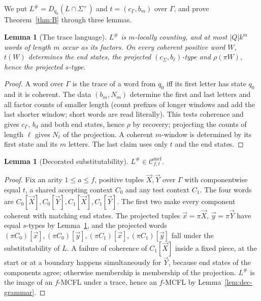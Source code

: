 \documentclass[11pt]{article}
\numberwithin{equation}{section}
\theoremstyle{plain}
\newtheorem{lemma}[theorem]{Lemma}
\theoremstyle{definition}
\theoremstyle{remark}
\theoremstyle{plain}
\newcommand{\Cmcf}[2]{\mathcal{C}^{\mathrm{mcf}}_{#1,#2}}
\newcommand{\tuple}[1]{\vec{#1}}
\begin{document}
We put $L^\#=D_{q_0}(L\cap\Sigma^+)$ and $t=(c_\Gamma,b_m)$ over $\Gamma$, and
prove Theorem~\ref{thm:B} through three lemmas.

\begin{lemma}[The trace language]
\label{lem:trace-local}
$L^\#$ is $m$-locally counting, and at most $|Q|k^m$ words of length $m$ occur
as its factors.  On every coherent positive word $W$, $t(W)$ determines the end
states, the projected $(c_\Sigma,b_\ell)$-type and $\rho(\pi W)$, hence the
projected $s$-type.
\end{lemma}

\begin{proof}
A word over $\Gamma$ is the trace of a word from $q_0$ iff its first letter has
state $q_0$ and it is coherent.  The data $(b_m,N_m)$ determine the first and
last letters and all factor counts of smaller length (count prefixes of longer
windows and add the last shorter window; short words are read literally).  This
tests coherence and gives $c_\Gamma$, $b_d$ and both end states, hence $\rho$ by
recovery; projecting the counts of length $\ell$ gives $N_\ell$ of the
projection.  A coherent $m$-window is determined by its first state and its $m$
letters.  The last claim uses only $t$ and the end states.
\end{proof}

\begin{lemma}[Decorated substitutability]
\label{lem:dec-subst}
$L^\#\in\Cmcf{f}{t}$.
\end{lemma}

\begin{proof}
Fix an arity $1\le a\le f$, positive tuples $\tuple X,\tuple Y$ over $\Gamma$ with
componentwise equal $t$, a shared accepting context $C_0$ and any test context
$C_1$.  The four words are $C_0[\tuple X],C_0[\tuple Y],C_1[\tuple X],C_1[\tuple
Y]$.  The first two make every component coherent with matching end states.  The
projected tuples $\tuple x=\pi\tuple X$, $\tuple y=\pi\tuple Y$ have equal
$s$-types by Lemma~\ref{lem:trace-local}, and the projected words
$(\pi C_0)[\tuple x],(\pi C_0)[\tuple y],(\pi C_1)[\tuple x],(\pi C_1)[\tuple y]$
fall under the substitutability of $L$.  A failure of coherence of
$C_1[\tuple X]$ inside a fixed piece, at the start or at a boundary happens
simultaneously for $\tuple Y$, because end states of the components agree;
otherwise membership is membership of the projection.  $L^\#$ is the image of an
$f$-MCFL under a trace, hence an $f$-MCFL by Lemma~\ref{lem:dec-grammar}.
\end{proof}
\end{document}
